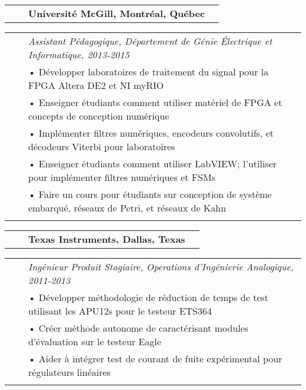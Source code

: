 \documentclass{minimal}
\begin{document}
\pagebreak

\begin{tabular}{ p{1.5cm} p{1cm} p{10cm} >{\raggedleft\arraybackslash}p{3cm} }
& & \textbf{Université McGill, Montréal, Québec} & \\
\end{tabular}

\begin{tabular}{ p{1.5cm} p{1cm} p{16cm} }
& & \textit{Assistant Pédagogique, Département de Génie Électrique et Informatique, 2013-2015}\\
& & • Développer laboratoires de traitement du signal pour la FPGA Altera DE2 et NI myRIO\\
& & • Enseigner étudiants comment utiliser matériel de FPGA et concepts de conception numérique\\ 
& & • Implémenter filtres numériques, encodeurs convolutifs, et décodeurs Viterbi pour laboratoires\\
& & • Enseigner étudiants comment utiliser LabVIEW; l'utiliser pour implémenter filtres numériques et FSMs\\
& & • Faire un cours pour étudiants sur conception de système embarqué, réseaux de Petri, et réseaux de Kahn\\
& & \\
\end{tabular}

\begin{tabular}{ p{1.5cm} p{1cm} p{10cm} >{\raggedleft\arraybackslash}p{3cm} }
& & \textbf{Texas Instruments, Dallas, Texas} & \\
\end{tabular}

\begin{tabular}{ p{1.5cm} p{1cm} p{16cm} }
& & \textit{Ingénieur Produit Stagiaire, Operations d'Ingénierie Analogique, 2011-2013}\\
& & • Développer méthodologie de réduction de temps de test utilisant les APU12s pour le testeur ETS364\\
& & • Créer méthode autonome de caractérisant modules d'évaluation sur le testeur Eagle\\
& & • Aider à intégrer test de courant de fuite expérimental pour régulateurs linéaires\\
& & \\
\end{tabular}
\end{document}
